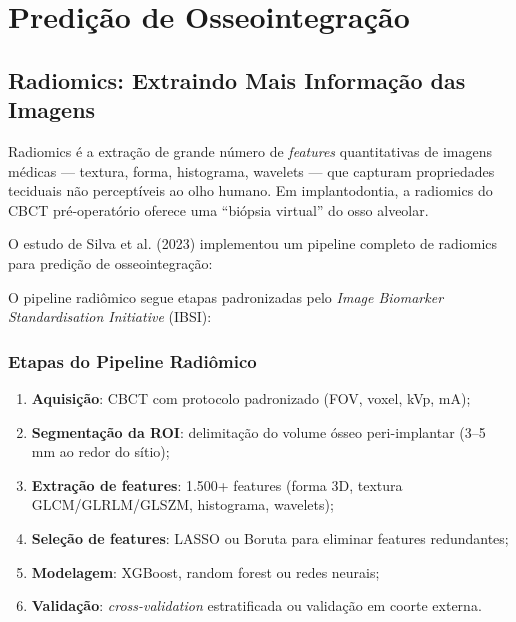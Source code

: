 \section{Predição de Osseointegração}

\subsection{Radiomics: Extraindo Mais Informação das Imagens}

Radiomics é a extração de grande número de \textit{features} quantitativas de imagens médicas --- textura, forma, histograma, wavelets --- que capturam propriedades teciduais não perceptíveis ao olho humano. Em implantodontia, a radiomics do CBCT pré-operatório oferece uma ``biópsia virtual'' do osso alveolar.

O estudo de Silva et al. (2023) implementou um pipeline completo de radiomics para predição de osseointegração:


O pipeline radiômico segue etapas padronizadas pelo \textit{Image Biomarker Standardisation Initiative} (IBSI):

\subsubsection{Etapas do Pipeline Radiômico}

\begin{enumerate}
    \item \textbf{Aquisição}: CBCT com protocolo padronizado (FOV, voxel, kVp, mA);
    \item \textbf{Segmentação da ROI}: delimitação do volume ósseo peri-implantar (3--5 mm ao redor do sítio);
    \item \textbf{Extração de features}: 1.500+ features (forma 3D, textura GLCM/GLRLM/GLSZM, histograma, wavelets);
    \item \textbf{Seleção de features}: LASSO ou Boruta para eliminar features redundantes;
    \item \textbf{Modelagem}: XGBoost, random forest ou redes neurais;
    \item \textbf{Validação}: \textit{cross-validation} estratificada ou validação em coorte externa.
\end{enumerate}


